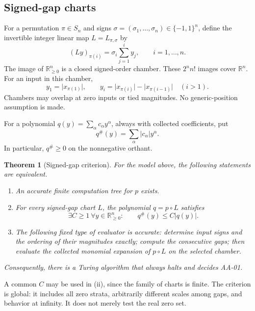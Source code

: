 \documentclass[11pt,a4paper]{article}
\newtheorem{theorem}{Theorem}[section]
\theoremstyle{definition}
\theoremstyle{remark}
\newcommand{\R}{\mathbb R}
\newcommand{\abs}[1]{\lvert #1\rvert}
\newcommand{\maj}[1]{#1^{\#}}
\begin{document}
\subsection{Signed-gap charts}

For a permutation $\pi\in S_n$ and signs
$\sigma=(\sigma_1,\ldots,\sigma_n)\in\{-1,1\}^n$, define the invertible
integer linear map $L=L_{\pi,\sigma}$ by
\begin{equation}\label{eq:chart}
 (Ly)_{\pi(i)}=\sigma_i\sum_{j=1}^{i}y_j,
 \qquad i=1,\ldots,n.
\end{equation}
The image of $\R_{\ge0}^n$ is a closed signed-order chamber. These
$2^n n!$ images cover $\R^n$. For an input in this chamber,
\begin{equation}\label{eq:gaps}
 y_1=\abs{x_{\pi(1)}},\qquad
 y_i=\abs{x_{\pi(i)}}-\abs{x_{\pi(i-1)}}\quad (i>1).
\end{equation}
Chambers may overlap at zero inputs or tied magnitudes. No generic-position
assumption is made.

For a polynomial $q(y)=\sum_\alpha c_\alpha y^\alpha$, always with collected
coefficients, put
\begin{equation}\label{eq:majorant}
 \maj q(y)=\sum_\alpha\abs{c_\alpha}y^\alpha.
\end{equation}
In particular, $\maj q\ge0$ on the nonnegative orthant.

\begin{theorem}[Signed-gap criterion]\label{thm:main}
For the model above, the following statements are equivalent.
\begin{enumerate}[label=\textnormal{(\roman*)}]
\item An accurate finite computation tree for $p$ exists.
\item For every signed-gap chart $L$, the polynomial $q=p\circ L$ satisfies
\begin{equation}\label{eq:criterion}
 \exists C\ge1\ \forall y\in\R_{\ge0}^n:\qquad
 \maj q(y)\le C\abs{q(y)}.
\end{equation}
\item The following fixed type of evaluator is accurate: determine input signs
and the ordering of their magnitudes exactly; compute the consecutive gaps;
then evaluate the collected monomial expansion of $p\circ L$ on the selected
chamber.
\end{enumerate}
Consequently, there is a Turing algorithm that always halts and decides AA-01.
\end{theorem}

A common $C$ may be used in (ii), since the family of charts is finite. The
criterion is global: it includes all zero strata, arbitrarily different scales
among gaps, and behavior at infinity. It does not merely test the real zero set.
\end{document}
